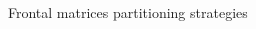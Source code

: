 \begin{frame}{Frontal matrices partitioning strategies}
\begin{columns}
\begin{column}{0.7\textwidth}
    \end{column}
    \begin{column}{0.3\textwidth}
      \begin{center}

\end{center}
\end{column}
\end{columns}
\end{frame}
